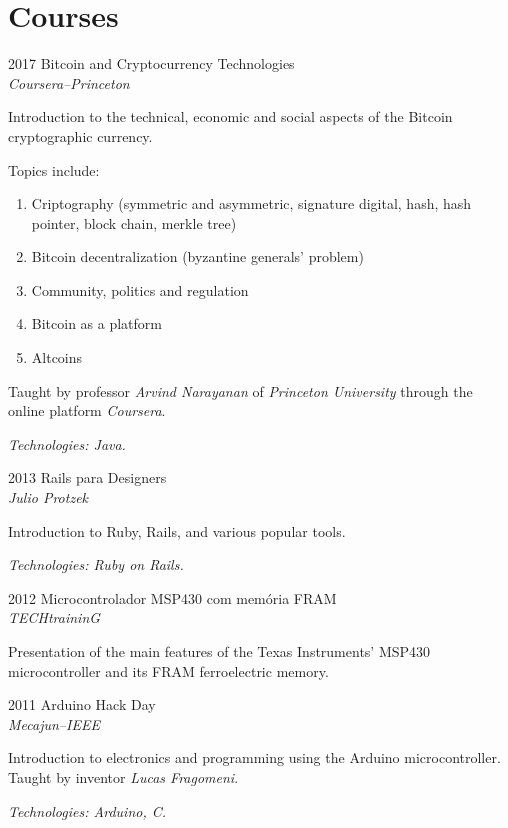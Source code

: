 \documentclass[a4paper]{simplecv}
\begin{document}
\section{Courses}

\begin{topic}
\item[2017] Bitcoin and Cryptocurrency Technologies\\
	{\em\small Coursera--Princeton}

	Introduction to the technical, economic and social aspects of the
	Bitcoin cryptographic currency.

	Topics include:
	\begin{enumerate}
		\item Criptography (symmetric and asymmetric, signature
			digital, hash, hash pointer, block chain, merkle tree)
		\item Bitcoin decentralization (byzantine generals' problem)
		\item Community, politics and regulation
		\item Bitcoin as a platform
		\item Altcoins
	\end{enumerate}

	Taught by professor \emph{Arvind Narayanan} of \emph{Princeton
	University} through the online platform \emph{Coursera}.

	{\em\scriptsize Technologies: Java.}

\item[2013] Rails para Designers\\
	{\em\small Julio Protzek}

	Introduction to Ruby, Rails, and various popular tools.

	{\em\scriptsize Technologies: Ruby on Rails.}

\item[2012] Microcontrolador MSP430 com memória FRAM\\
	{\em\small TECHtraininG}

	Presentation of the main features of the Texas Instruments' MSP430
	microcontroller and its FRAM ferroelectric memory.

\item[2011] Arduino Hack Day\\
	{\em\small Mecajun--IEEE}

	Introduction to electronics and programming using the Arduino
	microcontroller. Taught by inventor \emph{Lucas Fragomeni}.

	{\em\scriptsize Technologies: Arduino, C.}

\end{topic}
\end{document}
